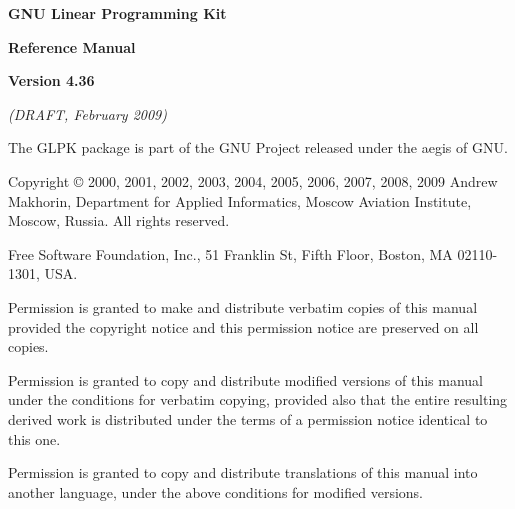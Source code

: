 \documentclass[dvipdfm,11pt]{report}
\begin{document}
\thispagestyle{empty}

\begin{center}

\vspace*{1in}

\begin{huge}
\bf GNU Linear Programming Kit
\end{huge}

\vspace{0.5in}

\begin{LARGE}
\bf Reference Manual
\end{LARGE}

\vspace{0.5in}

\begin{LARGE}
\bf Version 4.36
\end{LARGE}

\vspace{0.5in}
\begin{Large}
\it(DRAFT, February 2009)
\end{Large}
\end{center}

\newpage

\vspace*{1in}

\vfill

\noindent
The GLPK package is part of the GNU Project released under the aegis of
GNU.

\medskip \noindent
Copyright \copyright{} 2000, 2001, 2002, 2003, 2004, 2005, 2006, 2007,
2008, 2009 Andrew Makhorin, Department for Applied Informatics, Moscow
Aviation Institute, Moscow, Russia. All rights reserved.

\medskip \noindent
Free Software Foundation, Inc., 51 Franklin St, Fifth Floor, Boston, MA
02110-1301, USA.

\medskip \noindent
Permission is granted to make and distribute verbatim copies of this
manual provided the copyright notice and this permission notice are
preserved on all copies.

\medskip \noindent
Permission is granted to copy and distribute modified versions of this
manual under the conditions for verbatim copying, provided also that the
entire resulting derived work is distributed under the terms of
a permission notice identical to this one.

\medskip \noindent
Permission is granted to copy and distribute translations of this manual
into another language, under the above conditions for modified versions.

\tableofcontents













\appendix










\end{document}
